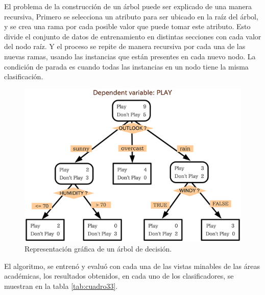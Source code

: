 El problema de la construcción de un árbol puede ser explicado de una manera recursiva, Primero se selecciona un atributo para ser ubicado en la raíz del árbol, y se crea una rama por cada posible valor que puede tomar este atributo. Esto divide el conjunto de datos de entrenamiento en distintas secciones con cada valor del nodo raíz. Y el proceso se repite de manera recursiva por cada una de las nuevas ramas, usando las instancias que están presentes en cada nuevo nodo. La condición de parada es cuando todas las instancias en un nodo tiene la misma clasificación\cite{key-210}.
\begin{figure}[H]
\begin{centering}
\includegraphics[scale=0.6]{c45}
\par\end{centering}
\caption{Representación gráfica de un árbol de decisión.}
\end{figure}
El algoritmo, se entrenó y evaluó con cada una de las vistas minables de las áreas académicas, los resultados obtenidos, en cada uno de los clasificadores, se muestran en la tabla \ref{tab:cuadro33}.\\

